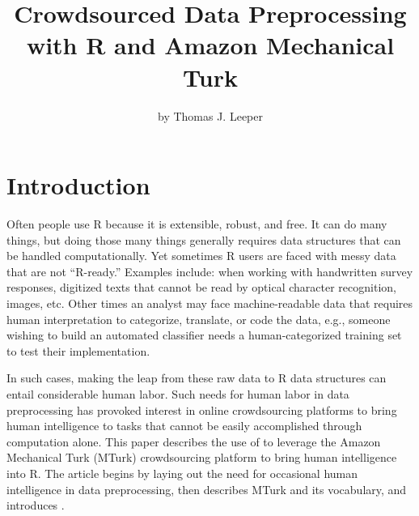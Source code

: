 \title{Crowdsourced Data Preprocessing with R and Amazon Mechanical Turk}
\author{by Thomas J. Leeper}

\maketitle


\section{Introduction}

Often people use R because it is extensible, robust, and free. It can do many things, but doing those many things generally requires data structures that can be handled computationally. Yet sometimes R users are faced with messy data that are not ``R-ready.'' Examples include: when working with handwritten survey responses, digitized texts that cannot be read by optical character recognition, images, etc. Other times an analyst may face machine-readable data that requires human interpretation to categorize, translate, or code the data, e.g., someone wishing to build an automated classifier needs a human-categorized training set to test their implementation.

In such cases, making the leap from these raw data to R data structures can entail considerable human labor. Such needs for human labor in data preprocessing has provoked interest in online crowdsourcing platforms \citep{Schmidt2010, ChenMenezesBradley2011} to bring human intelligence to tasks that cannot be easily accomplished through computation alone. This paper describes the use of  \citep{Leeper2012c} to leverage the Amazon Mechanical Turk (MTurk) crowdsourcing platform to bring human intelligence into R. The article begins by laying out the need for occasional human intelligence in data preprocessing, then describes MTurk and its vocabulary, and introduces . 

